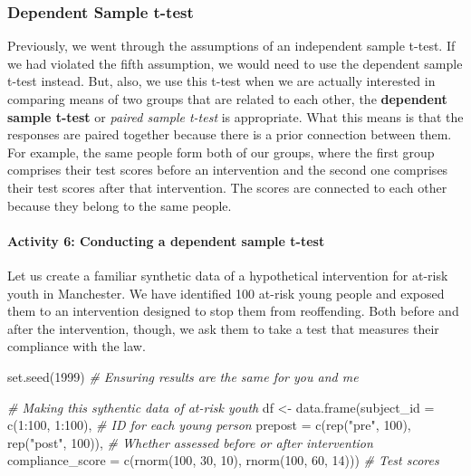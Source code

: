 \documentclass[
]{book}
\newenvironment{Shaded}{\begin{snugshade}}{\end{snugshade}}
\newcommand{\AttributeTok}[1]{\textcolor[rgb]{0.77,0.63,0.00}{#1}}
\newcommand{\CommentTok}[1]{\textcolor[rgb]{0.56,0.35,0.01}{\textit{#1}}}
\newcommand{\DecValTok}[1]{\textcolor[rgb]{0.00,0.00,0.81}{#1}}
\newcommand{\FunctionTok}[1]{\textcolor[rgb]{0.00,0.00,0.00}{#1}}
\newcommand{\NormalTok}[1]{#1}
\newcommand{\OtherTok}[1]{\textcolor[rgb]{0.56,0.35,0.01}{#1}}
\newcommand{\SpecialCharTok}[1]{\textcolor[rgb]{0.00,0.00,0.00}{#1}}
\newcommand{\StringTok}[1]{\textcolor[rgb]{0.31,0.60,0.02}{#1}}
\begin{document}
\hypertarget{dependent-sample-t-test}{%
\subsubsection{Dependent Sample t-test}\label{dependent-sample-t-test}}

Previously, we went through the assumptions of an independent sample t-test. If we had violated the fifth assumption, we would need to use the dependent sample t-test instead. But, also, we use this t-test when we are actually interested in comparing means of two groups that are related to each other, the \textbf{dependent sample t-test} or \emph{paired sample t-test} is appropriate. What this means is that the responses are paired together because there is a prior connection between them. For example, the same people form both of our groups, where the first group comprises their test scores before an intervention and the second one comprises their test scores after that intervention. The scores are connected to each other because they belong to the same people.

\hypertarget{activity-6-conducting-a-dependent-sample-t-test}{%
\paragraph{Activity 6: Conducting a dependent sample t-test}\label{activity-6-conducting-a-dependent-sample-t-test}}

Let us create a familiar synthetic data of a hypothetical intervention for at-risk youth in Manchester. We have identified 100 at-risk young people and exposed them to an intervention designed to stop them from reoffending. Both before and after the intervention, though, we ask them to take a test that measures their compliance with the law.

\begin{Shaded}
\begin{Highlighting}[]
\FunctionTok{set.seed}\NormalTok{(}\DecValTok{1999}\NormalTok{) }\CommentTok{\# Ensuring results are the same for you and me}

\CommentTok{\# Making this sythentic data of at{-}risk youth}
\NormalTok{df }\OtherTok{\textless{}{-}} \FunctionTok{data.frame}\NormalTok{(}\AttributeTok{subject\_id =} \FunctionTok{c}\NormalTok{(}\DecValTok{1}\SpecialCharTok{:}\DecValTok{100}\NormalTok{, }\DecValTok{1}\SpecialCharTok{:}\DecValTok{100}\NormalTok{), }\CommentTok{\# ID for each young person}
                 \AttributeTok{prepost =} \FunctionTok{c}\NormalTok{(}\FunctionTok{rep}\NormalTok{(}\StringTok{"pre"}\NormalTok{, }\DecValTok{100}\NormalTok{), }\FunctionTok{rep}\NormalTok{(}\StringTok{"post"}\NormalTok{, }\DecValTok{100}\NormalTok{)), }\CommentTok{\# Whether assessed before or after intervention}
                 \AttributeTok{compliance\_score =} \FunctionTok{c}\NormalTok{(}\FunctionTok{rnorm}\NormalTok{(}\DecValTok{100}\NormalTok{, }\DecValTok{30}\NormalTok{, }\DecValTok{10}\NormalTok{), }\FunctionTok{rnorm}\NormalTok{(}\DecValTok{100}\NormalTok{, }\DecValTok{60}\NormalTok{, }\DecValTok{14}\NormalTok{))) }\CommentTok{\# Test scores}
\end{Highlighting}
\end{Shaded}
\end{document}
